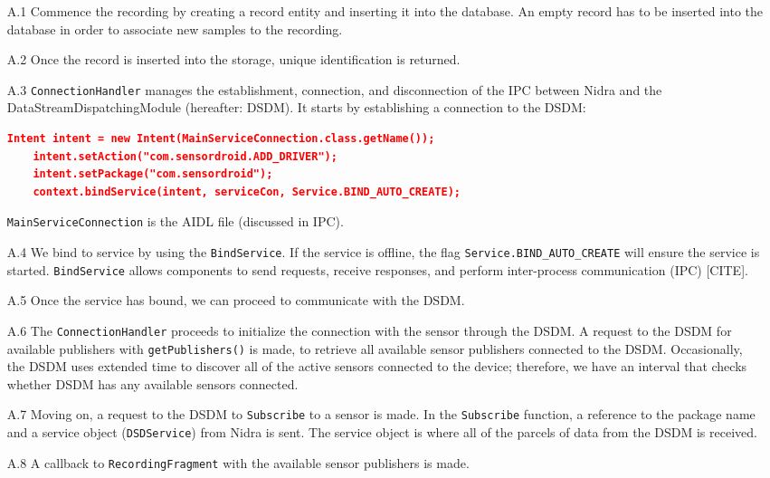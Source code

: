 \begin{itemize}
    \item[A.1] Commence the recording by creating a record entity and inserting it into the database. An empty record has to be inserted into the database in order to associate new samples to the recording. 
    \item[A.2] Once the record is inserted into the storage, unique identification is returned. 
    \item[A.3] \verb|ConnectionHandler| manages the establishment, connection, and disconnection of the IPC between Nidra and the DataStreamDispatchingModule (hereafter: DSDM). It starts by establishing a connection to the DSDM:
\begin{lstlisting}[language=json, caption={My Caption}, captionpos=b]
    Intent intent = new Intent(MainServiceConnection.class.getName());
    intent.setAction("com.sensordroid.ADD_DRIVER");
    intent.setPackage("com.sensordroid");
    context.bindService(intent, serviceCon, Service.BIND_AUTO_CREATE);
\end{lstlisting}
    \verb|MainServiceConnection| is the AIDL file (discussed in IPC).
    \item[A.4] We bind to service by using the \verb|BindService|. If the service is offline, the flag \verb|Service.BIND_AUTO_CREATE| will ensure the service is started. \verb|BindService| allows components to send requests, receive responses, and perform inter-process communication (IPC) [CITE]. 
    \item[A.5] Once the service has bound, we can proceed to communicate with the DSDM. 
   	\item[A.6] The \verb|ConnectionHandler| proceeds to initialize the connection with the sensor through the DSDM.  A request to the DSDM for available publishers with \verb|getPublishers()| is made, to retrieve all available sensor publishers connected to the DSDM. Occasionally, the DSDM uses extended time to discover all of the active sensors connected to the device; therefore, we have an interval that checks whether DSDM has any available sensors connected.
	\item[A.7] Moving on,  a request to the DSDM to \verb|Subscribe| to a sensor is made.  In the \verb|Subscribe| function, a reference to the package name and a service object (\verb|DSDService|) from Nidra is sent. The service object is where all of the parcels of data from the DSDM is received.   
	\item[A.8] A callback to \verb|RecordingFragment|  with the available sensor publishers is made. 

\end{itemize}

